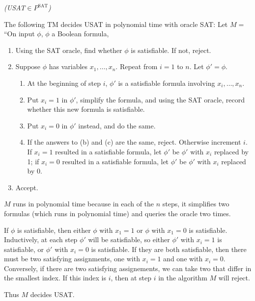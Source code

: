 \pagebreak

\begin{problem}{\it(USAT$\in P^{\text{SAT}}$)}

The following TM decides USAT in polynomial time with oracle SAT: Let $M=$``On input $\phi$, $\phi$ a Boolean formula,
\begin{enumerate}
\item Using the SAT oracle, find whether $\phi$ is satisfiable. If not, reject.
\item Suppose $\phi$ has variables $x_1,\ldots, x_n$. Repeat from $i=1$ to $n$. Let $\phi'=\phi$.
\begin{enumerate}
\item At the beginning of step $i$, %
$\phi'$ is a satisfiable formula involving $x_i,\ldots, x_n$.
\item
Put $x_i=1$ in $\phi'$, simplify the formula, and using the SAT oracle, record whether this new formula is satisfiable.
\item
Put $x_i=0$ in $\phi'$ instead, and do the same.
\item If the answers to (b) and (c) are the same, reject. Otherwise increment $i$. If $x_i=1$ resulted in a satisfiable formula, let $\phi'$ be $\phi'$ with $x_i$ replaced by 1; if $x_i=0$ resulted in a satisfiable formula, let $\phi'$ be $\phi'$ with $x_i$ replaced by 0.
\end{enumerate}
\item Accept.
\end{enumerate}
$M$ runs in polynomial time because in each of the $n$ steps, it simplifies two formulas (which runs in polynomial time) and queries the oracle two times.

If $\phi$ is satisfiable, then either $\phi$ with $x_1=1$ or $\phi$ with $x_1=0$ is satisfiable. Inductively, at each step $\phi'$ will be satisfiable, so either $\phi'$ with $x_i=1$ is satisfiable, or $\phi'$ with $x_i=0$ is satisfiable. 
If they are both satisfiable, then there must be two satisfying assignments, one with $x_i=1$ and one with $x_i=0$. Conversely, if there are two satisfying assignements, we can take two that differ in the smallest index. If this index is $i$, then at step $i$ in the algorithm $M$ will reject.

Thus $M$ decides USAT.
\end{problem}

\pagebreak

